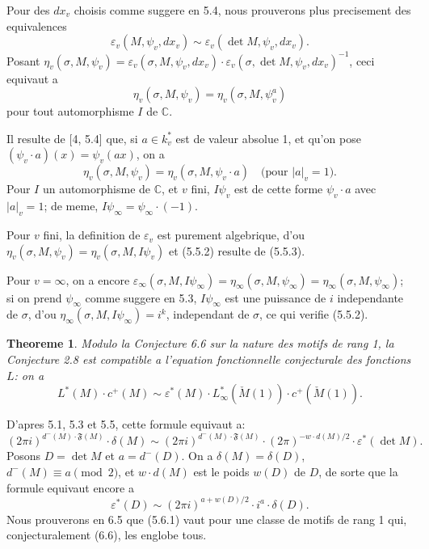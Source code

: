 \documentclass[12pt,a4paper]{article}
\theoremstyle{plain}
\newtheorem{theorem}{Theoreme}[section]
\theoremstyle{definition}
\theoremstyle{remark}
\newcommand{\C}{\mathbb{C}}
\begin{document}
Pour des $dx_v$ choisis comme suggere en 5.4, nous prouverons plus precisement
des equivalences
\begin{equation}\label{eq:5.5.1}
\varepsilon_v(M, \psi_v, dx_v) \sim \varepsilon_v(\det M, \psi_v, dx_v).
\end{equation}
Posant $\eta_v(\sigma, M, \psi_v) = \varepsilon_v(\sigma, M, \psi_v, dx_v) \cdot \varepsilon_v(\sigma, \det M, \psi_v, dx_v)^{-1}$,
ceci equivaut a
\begin{equation}\label{eq:5.5.2}
\eta_v(\sigma, M, \psi_v) = \eta_v(\sigma, M, \psi_v^a)
\end{equation}
pour tout automorphisme $I$ de $\C$.

Il resulte de [4, 5.4] que, si $a \in k_v^*$ est de valeur absolue 1, et qu'on pose
$(\psi_v \cdot a)(x) = \psi_v(ax)$, on a
\begin{equation}\label{eq:5.5.3}
\eta_v(\sigma, M, \psi_v) = \eta_v(\sigma, M, \psi_v \cdot a) \quad \text{(pour } |a|_v = 1\text{).}
\end{equation}
Pour $I$ un automorphisme de $\C$, et $v$ fini, $I \psi_v$ est de cette forme $\psi_v \cdot a$
avec $|a|_v = 1$; de meme, $I \psi_\infty = \psi_\infty \cdot (-1)$.

Pour $v$ fini, la definition de $\varepsilon_v$ est purement algebrique, d'ou
$\eta_v(\sigma, M, \psi_v) = \eta_v(\sigma, M, I \psi_v)$ et (5.5.2) resulte de (5.5.3).

Pour $v = \infty$, on a encore $\varepsilon_\infty(\sigma, M, I \psi_\infty) = \eta_\infty(\sigma, M, \psi_\infty) =
\eta_\infty(\sigma, M, \psi_\infty)$; si on prend $\psi_\infty$ comme suggere en 5.3, $I \psi_\infty$ est une
puissance de $i$ independante de $\sigma$, d'ou $\eta_\infty(\sigma, M, I \psi_\infty) = i^k$, independant de
$\sigma$, ce qui verifie (5.5.2).

\begin{theorem}\label{thm:5.6}
Modulo la Conjecture 6.6 sur la nature des motifs de rang 1, la Conjecture 2.8
est compatible a l'equation fonctionnelle conjecturale des fonctions $L$: on a
\[
L^*(M) \cdot c^+(M) \sim \varepsilon^*(M) \cdot L^*_\infty(\check{M}(1)) \cdot c^+(\check{M}(1)).
\]
\end{theorem}

D'apres 5.1, 5.3 et 5.5, cette formule equivaut a:
\[
(2\pi i)^{d^-(M) \cdot \mathfrak{F}(M)} \cdot \delta(M) \sim (2\pi i)^{d^-(M) \cdot \mathfrak{F}(M)} \cdot (2\pi)^{-w \cdot d(M)/2} \cdot \varepsilon^*(\det M).
\]
Posons $D = \det M$ et $a = d^-(D)$. On a $\delta(M) = \delta(D)$, $d^-(M) \equiv a \pmod 2$,
et $w \cdot d(M)$ est le poids $w(D)$ de $D$, de sorte que la formule equivaut encore a
\begin{equation}\label{eq:5.6.1}
\varepsilon^*(D) \sim (2\pi i)^{a + w(D)/2} \cdot i^a \cdot \delta(D).
\end{equation}
Nous prouverons en 6.5 que (5.6.1) vaut pour une classe de motifs de rang 1 qui,
conjecturalement (6.6), les englobe tous.
\end{document}
